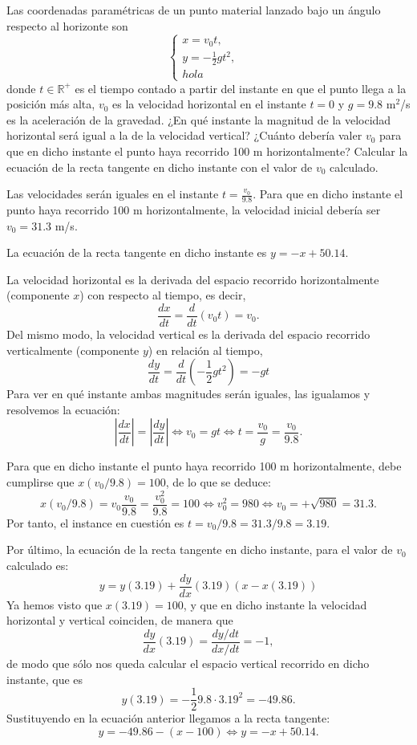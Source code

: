 {Las coordenadas paramétricas de un punto material lanzado bajo un ángulo respecto al horizonte son
\[
\begin{cases}
x=v_0t, & \\
y=-\frac{1}{2}gt^2, \\
hola
\end{cases}
\]
donde $t\in \mathbb{R}^{+}$ es el tiempo contado a partir del instante en que el punto llega a la posición más alta, $v_0$ es la velocidad horizontal en el instante $t=0$ y $g=9.8$ m$^2$/s es la aceleración de la gravedad.
¿En qué instante la magnitud de la velocidad horizontal será igual a la de la velocidad vertical? ¿Cuánto debería valer $v_0$ para que en dicho instante el punto haya recorrido 100 m horizontalmente?
Calcular la ecuación de la recta tangente en dicho instante con el valor de $v_0$ calculado.
}
{
Las velocidades serán iguales en el instante $ t=\frac{v_0}{9.8}$. Para que en dicho instante el punto haya recorrido 100 m horizontalmente,
la velocidad inicial debería ser $v_0 = 31.3$ m/s.

La ecuación de la recta tangente en dicho instante es $y =-x+50.14$.
}
{La velocidad horizontal es la derivada del espacio recorrido horizontalmente (componente $x$) con respecto al tiempo, es decir,
\[
\frac{dx}{dt} = \frac{d}{dt}(v_0t)=v_0.
\]
Del mismo modo, la velocidad vertical es la derivada del espacio recorrido verticalmente (componente $y$) en relación al tiempo,
\[
\frac{dy}{dt} = \frac{d}{dt}(-\frac{1}{2}gt^2)=-gt
\]
Para ver en qué instante ambas magnitudes serán iguales, las igualamos y resolvemos la ecuación:
\[
|\frac{dx}{dt}|=|\frac{dy}{dt}| \Leftrightarrow v_0 = gt \Leftrightarrow t=\frac{v_0}{g}=\frac{v_0}{9.8}.
\]

Para que en dicho instante el punto haya recorrido 100 m horizontalmente, debe cumplirse que $x(v_0/9.8)=100$, de lo que se deduce:
\[
x(v_0/9.8)=v_0\frac{v_0}{9.8} = \frac{v_0^2}{9.8}=100 \Leftrightarrow v_0^2 = 980 \Leftrightarrow v_0 = +\sqrt{980}= 31.3.
\]
Por tanto, el instance en cuestión es $t=v_0/9.8= 31.3/9.8 = 3.19$.

Por último, la ecuación de la recta tangente en dicho instante, para el valor de $v_0$ calculado es:
\[
y = y(3.19) + \frac{dy}{dx}(3.19) (x-x(3.19))
\]
Ya hemos visto que $x(3.19)=100$, y que en dicho instante la velocidad horizontal y vertical coinciden, de manera que
\[
\frac{dy}{dx}(3.19)=\frac{dy/dt}{dx/dt}=-1,
\]
de modo que sólo nos queda calcular el espacio vertical recorrido en dicho instante, que es
\[
y(3.19)=-\frac{1}{2}9.8\cdot 3.19^2= -49.86.
\]
Sustituyendo en la ecuación anterior llegamos a la recta tangente:
\[
y = -49.86-(x-100) \Leftrightarrow y=-x+50.14.
\]
}



